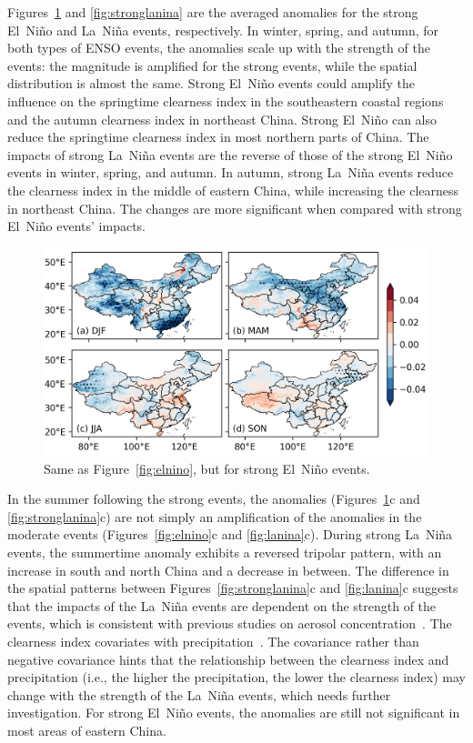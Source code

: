 \documentclass[atmosphere,article,accept,pdftex,moreauthors]{Definitions/mdpi}
\begin{document}
Figures~\ref{fig:strongelnino} and \ref{fig:stronglanina} are the averaged anomalies for the strong El~Niño and La~Niña events, respectively. In winter, spring, and autumn, for both types of ENSO events, the anomalies scale up with the strength of the events: the magnitude is amplified for the strong events, while the spatial distribution is almost the same. Strong El~Niño events could amplify the influence on the springtime clearness index in the southeastern coastal regions and the autumn clearness index in northeast China. Strong El~Niño can also reduce the springtime clearness index in most northern parts of China. The impacts of strong La~Niña events are the reverse of those of the strong El~Niño events in winter, spring, and autumn. In autumn, strong La~Niña events reduce the clearness index in the middle of eastern China, while increasing the clearness in northeast China. The changes are more significant when compared with strong El~Niño events' impacts.

\begin{figure}[H]
    \includegraphics[width=14cm]{fig/anom_strongelnino.png}
  \caption{Same as Figure~\ref{fig:elnino}, but for strong El~Niño events. \label{fig:strongelnino}}
\end{figure}

In the summer following the strong events, the anomalies (Figures~\ref{fig:strongelnino}c and \ref{fig:stronglanina}c) are not simply an amplification of the anomalies in the moderate events (Figures~\ref{fig:elnino}c and \ref{fig:lanina}c). During strong La~Niña events, the summertime anomaly exhibits a reversed tripolar pattern, with an increase in south and north China and a decrease in between. The difference in the spatial patterns between Figures~\ref{fig:stronglanina}c and \ref{fig:lanina}c suggests that the impacts of the La~Niña events are dependent on the strength of the events, which is consistent with previous studies on aerosol concentration~\cite{feng2017JGRA}. The clearness index covariates with precipitation~\cite{huang1989AAS, huang2012AAS}. The covariance rather than negative covariance hints that the relationship between the clearness index and precipitation (i.e., the higher the precipitation, the lower the clearness index) may change with the strength of the La~Niña events, which needs further investigation. For strong El~Niño events, the anomalies are still not significant in most areas of eastern China.
\end{document}
